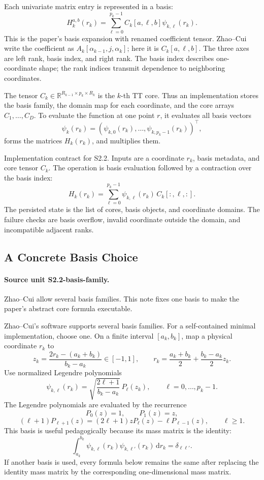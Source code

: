 \documentclass[11pt]{article}
\newcommand{\R}{\mathbb R}
\newcommand{\dd}{\,\mathrm d}
\begin{document}
Each univariate matrix entry is represented in a basis:
\[
    H_k^{a,b}(r_k)
    =
    \sum_{\ell=0}^{p_k-1}
    C_k[a,\ell,b]\psi_{k,\ell}(r_k).
    \tag{TT-3}
\]
This is the paper's basis expansion with renamed coefficient tensor.  Zhao--Cui
write the coefficient as \(A_k[\alpha_{k-1},j,\alpha_k]\); here it is
\(C_k[a,\ell,b]\).  The three axes are left rank, basis index, and right rank.
The basis index describes one-coordinate shape; the rank indices transmit
dependence to neighboring coordinates.

The tensor \(C_k\in\R^{R_{k-1}\times p_k\times R_k}\) is the \(k\)-th TT core.
Thus an implementation stores the basis family, the domain map for each
coordinate, and the core arrays \(C_1,\ldots,C_D\).  To evaluate the function at
one point \(r\), it evaluates all basis vectors
\[
    \psi_k(r_k)
    =
    (\psi_{k,0}(r_k),\ldots,\psi_{k,p_k-1}(r_k))^\top,
\]
forms the matrices \(H_k(r_k)\), and multiplies them.

Implementation contract for S2.2.  Inputs are a coordinate \(r_k\), basis
metadata, and core tensor \(C_k\).  The operation is basis evaluation followed
by a contraction over the basis index:
\[
    H_k(r_k)=\sum_{\ell=0}^{p_k-1}\psi_{k,\ell}(r_k)\,C_k[:,\ell,:].
    \tag{TT-3a}
\]
The persisted state is the list of cores, basis objects, and coordinate
domains.  The failure checks are basis overflow, invalid coordinate outside the
domain, and incompatible adjacent ranks.

\subsection{A Concrete Basis Choice}

\paragraph{Source unit S2.2-basis-family.}
Zhao--Cui allow several basis families.  This note fixes one basis to make the
paper's abstract core formula executable.

Zhao--Cui's software supports several basis families.  For a self-contained
minimal implementation, choose one.  On a finite interval
\([a_k,b_k]\), map a physical coordinate \(r_k\) to
\[
    z_k=\frac{2r_k-(a_k+b_k)}{b_k-a_k}\in[-1,1],
    \qquad
    r_k=\frac{a_k+b_k}{2}+\frac{b_k-a_k}{2}z_k.
    \tag{TT-6}
\]
Use normalized Legendre polynomials
\[
    \psi_{k,\ell}(r_k)
    =
    \sqrt{\frac{2\ell+1}{b_k-a_k}}\,
    P_\ell(z_k),
    \qquad \ell=0,\ldots,p_k-1.
    \tag{TT-7}
\]
The Legendre polynomials are evaluated by the recurrence
\[
    P_0(z)=1,\qquad P_1(z)=z,
\]
\[
    (\ell+1)P_{\ell+1}(z)
    =
    (2\ell+1)zP_\ell(z)-\ell P_{\ell-1}(z),
    \qquad \ell\ge1.
    \tag{TT-8}
\]
This basis is useful pedagogically because its mass matrix is the identity:
\[
    \int_{a_k}^{b_k}\psi_{k,\ell}(r_k)\psi_{k,\ell'}(r_k)\dd r_k
    =
    \delta_{\ell\ell'}.
    \tag{TT-9}
\]
If another basis is used, every formula below remains the same after replacing
the identity mass matrix by the corresponding one-dimensional mass matrix.
\end{document}
